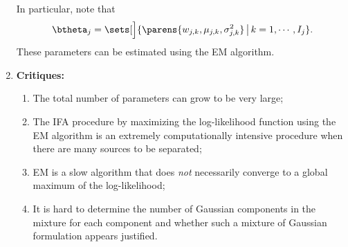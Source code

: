 \documentclass[12pt]{article}
\begin{document}
\begin{enumerate}[label=\textbf{\arabic*.}]
	In particular, note that 
	\begin{align*}
		\btheta_j = \sets[\Big]{\parens{w_{j,k}, \mu_{j,k}, \sigma_{j,k}^2} \,\big\vert\, k = 1, \cdots, I_j}. 
	\end{align*}
	These parameters can be estimated using the EM algorithm. 
	
	\item \textbf{Critiques:} 
	\begin{enumerate}
		\item The total number of parameters can grow to be very large; 
		\item The IFA procedure by maximizing the log-likelihood function using the EM algorithm is an extremely computationally intensive procedure when there are many sources to be separated; 
		\item EM is a slow algorithm that does \emph{not} necessarily converge to a global maximum of the log-likelihood; 
		\item It is hard to determine the number of Gaussian components in the mixture for each component and whether such a mixture of Gaussian formulation appears justified. 
	\end{enumerate}

\end{enumerate}

\printbibliography
\end{document}
